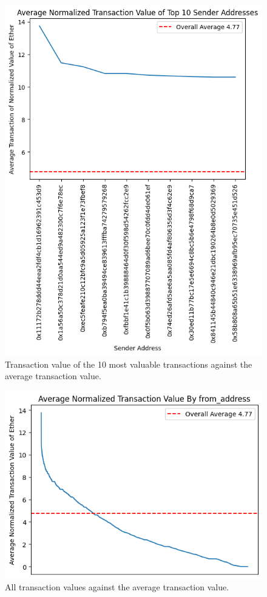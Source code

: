 \documentclass[sigconf]{acmart}
\begin{document}
\begin{figure}[H]
    \centering
    \includegraphics[width=0.8\linewidth]{M4-transaction-value-top10.png}
    \caption{Transaction value of the 10 most valuable transactions against the average transaction value.}
    \label{fig:transactionTop10}
\end{figure}

\begin{figure}[H]
    \centering
    \includegraphics[width=0.8\linewidth]{M4-transaction-value-normalized.png}
    \caption{All transaction values against the average transaction value.}
    \label{fig:transactionAll}
\end{figure}
\end{document}
